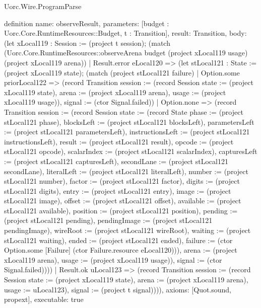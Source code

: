 \begin{lexlean}{Uorc.Wire.ProgramParse}
\begin{semanticmodule}
definition{
  name: observeResult,
  parameters: [budget : Uorc.Core.RuntimeResources::Budget, t : Transition],
  result: Transition,
  body: (let xLocal119 : Session := (project t session); (match (Uorc.Core.RuntimeResources::observeArena budget (project xLocal119 usage) (project xLocal119 arena))
    | Result.error eLocal120 => (let stLocal121 : State := (project xLocal119 state); (match (project stLocal121 failure)
      | Option.some priorLocal122 => (record Transition {session := (record Session {state := (project xLocal119 state), arena := (project xLocal119 arena), usage := (project xLocal119 usage)}), signal := (ctor Signal.failed)})
      | Option.none => (record Transition {session := (record Session {state := (record State {phase := (project stLocal121 phase), blocksLeft := (project stLocal121 blocksLeft), parametersLeft := (project stLocal121 parametersLeft), instructionsLeft := (project stLocal121 instructionsLeft), result := (project stLocal121 result), opcode := (project stLocal121 opcode), scalarIndex := (project stLocal121 scalarIndex), capturesLeft := (project stLocal121 capturesLeft), secondLane := (project stLocal121 secondLane), literalLeft := (project stLocal121 literalLeft), number := (project stLocal121 number), factor := (project stLocal121 factor), digits := (project stLocal121 digits), entry := (project stLocal121 entry), image := (project stLocal121 image), offset := (project stLocal121 offset), available := (project stLocal121 available), position := (project stLocal121 position), pending := (project stLocal121 pending), pendingImage := (project stLocal121 pendingImage), wireRoot := (project stLocal121 wireRoot), waiting := (project stLocal121 waiting), ended := (project stLocal121 ended), failure := (ctor Option.some [Failure] (ctor Failure.resource eLocal120))}), arena := (project xLocal119 arena), usage := (project xLocal119 usage)}), signal := (ctor Signal.failed)})))
    | Result.ok uLocal123 => (record Transition {session := (record Session {state := (project xLocal119 state), arena := (project xLocal119 arena), usage := uLocal123}), signal := (project t signal)}))),
  axioms: [Quot.sound, propext],
  executable: true
}


\end{semanticmodule}
\end{lexlean}
